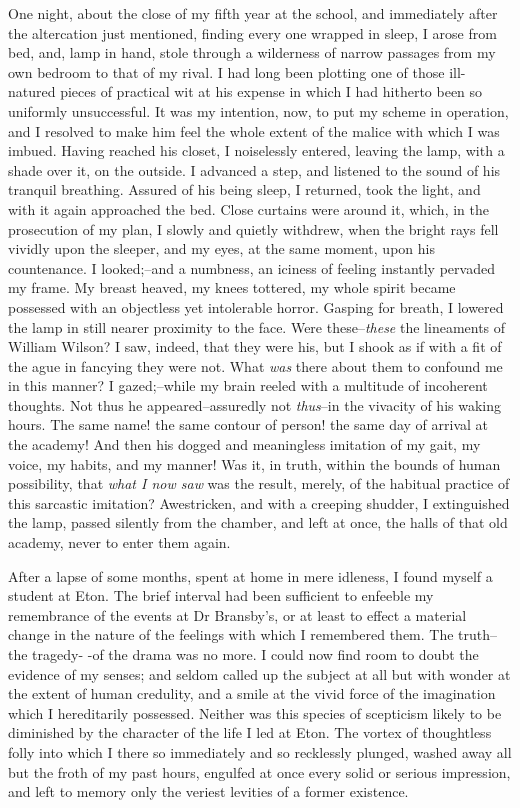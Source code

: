 \documentclass[12pt]{article}
\begin{document}
     One night, about the close of my fifth year at the school, and
immediately after the altercation just mentioned, finding every one
wrapped in sleep, I arose from bed, and, lamp in hand, stole
through a wilderness of narrow passages from my own bedroom to that
of my rival.  I had long been plotting one of those ill-natured
pieces of practical wit at his expense in which I had hitherto been
so uniformly unsuccessful.  It was my intention, now, to put my
scheme in operation, and I resolved to make him feel the whole
extent of the malice with which I was imbued.  Having reached his
closet, I noiselessly entered, leaving the lamp, with a shade over
it, on the outside.  I advanced a step, and listened to the sound
of his tranquil breathing.  Assured of his being sleep, I returned,
took the light, and with it again approached the bed.  Close
curtains were around it, which, in the prosecution of my plan, I
slowly and quietly withdrew, when the bright rays fell vividly upon
the sleeper, and my eyes, at the same moment, upon his countenance. 
I looked;--and a numbness, an iciness of feeling instantly pervaded
my frame.  My breast heaved, my knees tottered, my whole spirit
became possessed with an objectless yet intolerable horror. 
Gasping for breath, I lowered the lamp in still nearer proximity to
the face.  Were these--\emph{these} the lineaments of  William
Wilson?  I saw, indeed, that they were his, but I shook as if with
a fit of the ague in fancying they were not.  What \emph{was} there
about them to confound me in this manner?  I gazed;--while my brain
reeled with a multitude of incoherent thoughts.  Not thus he
appeared--assuredly not \emph{thus}--in the vivacity of his waking
hours.  The same name! the same contour of person! the same day of
arrival at the academy!  And then his dogged and meaningless
imitation of my gait, my voice, my habits, and my manner!  Was it,
in truth, within the bounds of human possibility, that \emph{what I
now saw} was the result, merely, of the habitual practice of this
sarcastic imitation?  Awestricken, and with a creeping shudder, I
extinguished the lamp, passed silently from the chamber, and left
at once, the halls of that old academy, never to enter them again.

     After a lapse of some months, spent at home in mere idleness,
I found myself a student at Eton.  The brief interval had been
sufficient to enfeeble my remembrance of the events at Dr
Bransby's, or at least to effect a material change in the nature of
the feelings with which I remembered them.  The truth--the tragedy-
-of the drama was no more.  I could now find room to doubt the
evidence of my senses; and seldom called up the subject at all but
with wonder at the extent of human credulity, and a smile at the
vivid force of the imagination which I hereditarily possessed. 
Neither was this species of scepticism likely to be diminished by
the character of the life I led at Eton.  The vortex of thoughtless
folly into which I there so immediately and so recklessly plunged,
washed away all but the froth of my past hours, engulfed at once
every solid or serious impression, and left to memory only the
veriest levities of a former existence.
\end{document}
